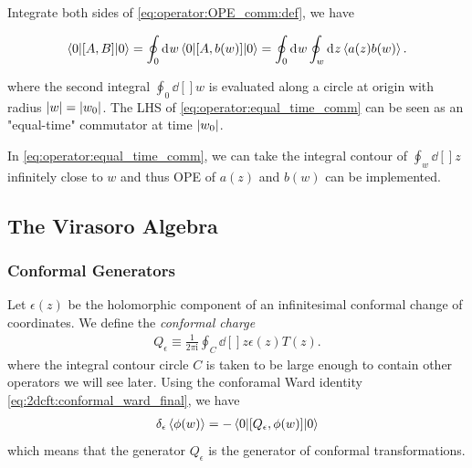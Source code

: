 \documentclass[10pt]{article}
\newcommand{\ii}{\mathrm{i}}
\newenvironment{boxmath}[1]{\begin{tcolorbox}[enhanced,attach boxed title to top center={yshift=-\tcboxedtitleheight/2},boxrule=1pt,title={\centering #1},colframe=NavyBlue!70!black,colback=NavyBlue!10,colbacktitle=NavyBlue!10,fonttitle=\scshape,coltitle=Black]}{\end{tcolorbox}}
\begin{document}
Integrate both sides of \cref{eq:operator:OPE_comm:def}, we have
\begin{boxmath}{Equal-time Commutator}
    \begin{align}
        \ev**{\comm{A}{B}}{0}=\oint_0\dd[]{w}\ev**{\comm{A}{b(w)}}{0}=\oint_0\dd[]{w}\oint_w\dd[]{z}\expval{a(z)b(w)}.\label{eq:operator:equal_time_comm}
    \end{align}
\end{boxmath}
where the second integral $\oint_0\dd[]{w}$ is evaluated along a circle at origin with radius $\abs{w}=\abs{w_0}$.
The LHS of \cref{eq:operator:equal_time_comm} can be seen as an "equal-time" commutator at time $\abs{w_0}$.
\begin{remark}
    In \cref{eq:operator:equal_time_comm}, we can take the integral contour of $\oint_w\dd[]{z}$ infinitely close to $w$ and thus OPE of $a(z)$ and $b(w)$ can be implemented.
\end{remark}


\subsection{The Virasoro Algebra}
\subsubsection{Conformal Generators}
Let $\epsilon(z)$ be the holomorphic component of an infinitesimal conformal change of coordinates.
We define the \textit{conformal charge}
\begin{align}
    Q_\epsilon\equiv\frac{1}{2\pi\ii}\oint_C\dd[]{z}\epsilon(z)T(z).\label{eq:operator:def:Q_epsilon}
\end{align}
where the integral contour circle $C$ is taken to be large enough to contain other operators we will see later.
Using the conforamal Ward identity \cref{eq:2dcft:conformal_ward_final}, we have
\begin{align}
    \delta_\epsilon\expval{\phi(w)}=-\ev**{\comm{Q_\epsilon}{\phi(w)}}{0}
\end{align}
which means that the generator $Q_\epsilon$ is the generator of conformal transformations.
\end{document}
